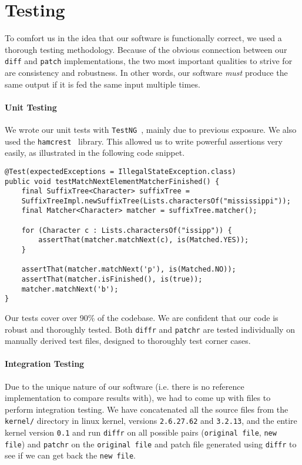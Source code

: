 \section{Testing}

To comfort us in the idea that our software is functionally correct, we used a thorough testing methodology. Because of the obvious connection between our \texttt{diff} and \texttt{patch} implementations, the two most important qualities to strive for are consistency and robustness. In other words, our software \textit{must} produce the same output if it is fed the same input multiple times.

\paragraph{Unit Testing}
We wrote our unit tests with \texttt{TestNG}~\cite{testng}, mainly due to previous exposure. We also used the \texttt{hamcrest}~\cite{hamcrest} library. This allowed us to write powerful assertions very easily, as illustrated in the following code snippet.

\begin{lstlisting}[caption={\texttt{diffr.suffixtree.impl.MatcherImplTest}}]
@Test(expectedExceptions = IllegalStateException.class)
public void testMatchNextElementMatcherFinished() {
    final SuffixTree<Character> suffixTree = 
    SuffixTreeImpl.newSuffixTree(Lists.charactersOf("mississippi"));
    final Matcher<Character> matcher = suffixTree.matcher();

    for (Character c : Lists.charactersOf("issipp")) {
        assertThat(matcher.matchNext(c), is(Matched.YES));
    }

    assertThat(matcher.matchNext('p'), is(Matched.NO));
    assertThat(matcher.isFinished(), is(true));
    matcher.matchNext('b');
}
\end{lstlisting}

Our tests cover over 90\% of the codebase. We are confident that our code is robust and thoroughly tested. Both \texttt{diffr} and \texttt{patchr} are tested individually on manually derived test files, designed to thoroughly test corner cases.

\paragraph{Integration Testing}
\label{IntegrationTesting}
Due to the unique nature of our software (i.e. there is no reference implementation to compare results with), we had to come up with files to perform integration testing. We have concatenated all the source files from the \texttt{kernel/} directory in linux kernel, versions \texttt{2.6.27.62} and \texttt{3.2.13}, and the entire kernel version \texttt{0.1} and run \texttt{diffr} on all possible pairs (\texttt{original file}, \texttt{new file}) and \texttt{patchr} on the \texttt{original file} and patch file generated using \texttt{diffr} to see if we can get back the \texttt{new file}.     

